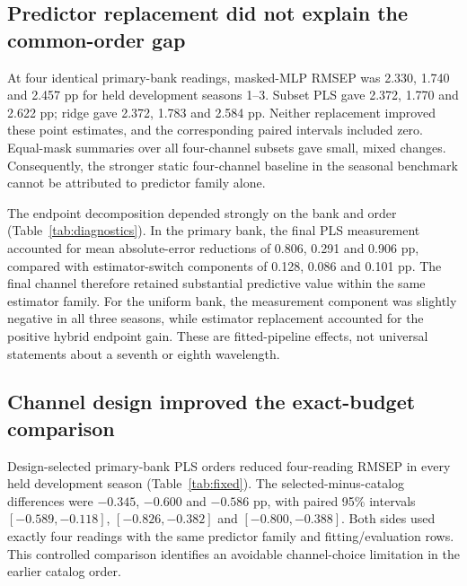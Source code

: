 \documentclass[Review,sagev,times]{sagej}
\begin{document}
\subsection{Predictor replacement did not explain the common-order gap}
At four identical primary-bank readings, masked-MLP RMSEP was 2.330, 1.740 and 2.457 pp for held development seasons 1--3. Subset PLS gave 2.372, 1.770 and 2.622 pp; ridge gave 2.372, 1.783 and 2.584 pp. Neither replacement improved these point estimates, and the corresponding paired intervals included zero. Equal-mask summaries over all four-channel subsets gave small, mixed changes. Consequently, the stronger static four-channel baseline in the seasonal benchmark cannot be attributed to predictor family alone.

The endpoint decomposition depended strongly on the bank and order (Table~\ref{tab:diagnostics}). In the primary bank, the final PLS measurement accounted for mean absolute-error reductions of 0.806, 0.291 and 0.906 pp, compared with estimator-switch components of 0.128, 0.086 and 0.101 pp. The final channel therefore retained substantial predictive value within the same estimator family. For the uniform bank, the measurement component was slightly negative in all three seasons, while estimator replacement accounted for the positive hybrid endpoint gain. These are fitted-pipeline effects, not universal statements about a seventh or eighth wavelength.

\begin{table}[tbp]\centering\small
\caption{Signed mean absolute-error reductions at the hybrid endpoint. Total equals estimator replacement at seven readings plus the final reading within PLS. Values and population intervals are in pp; negative components are retained.}\label{tab:diagnostics}
\resizebox{\linewidth}{!}{}
\end{table}

\subsection{Channel design improved the exact-budget comparison}
Design-selected primary-bank PLS orders reduced four-reading RMSEP in every held development season (Table~\ref{tab:fixed}). The selected-minus-catalog differences were $-0.345$, $-0.600$ and $-0.586$ pp, with paired 95\% intervals $[-0.589,-0.118]$, $[-0.826,-0.382]$ and $[-0.800,-0.388]$. Both sides used exactly four readings with the same predictor family and fitting/evaluation rows. This controlled comparison identifies an avoidable channel-choice limitation in the earlier catalog order.
\end{document}
